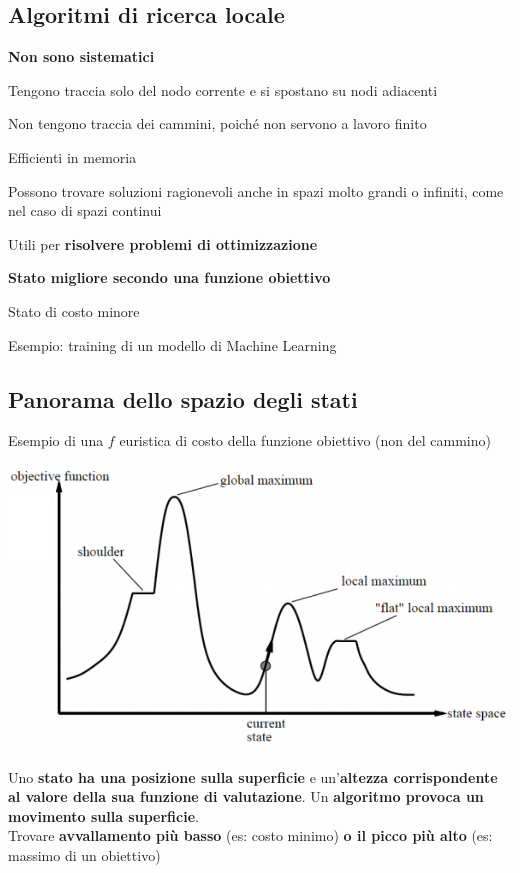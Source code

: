 \documentclass[10pt]{book}
\begin{document}
\subsection{Algoritmi di ricerca locale}
\begin{list}{}{}
	\item \textbf{Non sono sistematici}
	\item Tengono traccia solo del nodo corrente e si spostano su nodi adiacenti
	\item Non tengono traccia dei cammini, poiché non servono a lavoro finito
	\begin{list}{}{}
		\item Efficienti in memoria
		\item Possono trovare soluzioni ragionevoli anche in spazi molto grandi o infiniti, come nel caso di spazi continui
	\end{list}
	\item Utili per \textbf{risolvere problemi di ottimizzazione}
	\begin{list}{}{}
		\item \textbf{Stato migliore secondo una funzione obiettivo}
		\item Stato di costo minore
		\item Esempio: training di un modello di Machine Learning
	\end{list}
\end{list}
\pagebreak
\subsection{Panorama dello spazio degli stati}
Esempio di una $f$ euristica di costo della funzione obiettivo (non del cammino)
\begin{center}
	\includegraphics[scale=1]{statesspace.png}
\end{center}
Uno \textbf{stato ha una posizione sulla superficie} e un'\textbf{altezza corrispondente al valore della sua funzione di valutazione}. Un \textbf{algoritmo provoca un movimento sulla superficie}.\\
Trovare \textbf{avvallamento più basso} (es: costo minimo) \textbf{o il picco più alto} (es: massimo di un obiettivo)
\end{document}
